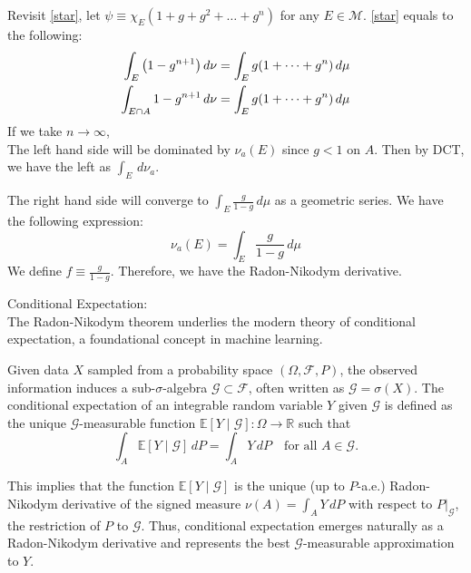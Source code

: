 \begin{prf}
Revisit \eqref{star}, let $\psi \equiv \chi_E(1+g+g^2+\dots + g^n)$ for any $E\in \mathcal M$. \eqref{star} equals to the following:  
\begin{align*}
	\int_E\qty(1-g^{n+1})\, d\nu &= \int_E g\qty(1+\dots + g^n)\, d\mu\\
	\int_{E\cap A} 1-g^{n+1}\, d\nu &= \int_E  g\qty(1+\dots + g^n)\, d\mu
\end{align*}
If we take $n\to \infty$, \\

The left hand side will be dominated by $\nu_a(E)$ since $g<1$ on $A$. Then by DCT, we have the left as $\int_E \, d\nu_a$. 

The right hand side will converge to $\int_E \frac{g}{1-g}\, d\mu$ as a geometric series. We have the following expression: 
$$\nu_a(E) = \int_E \frac{g}{1-g} \, d\mu$$
We define $f\equiv \frac{g}{1-g}$. Therefore, we have the Radon-Nikodym derivative. 

\end{prf}


\begin{rmk}{Conditional Expectation:}\\
The Radon-Nikodym theorem underlies the modern theory of conditional expectation, a foundational concept in machine learning. 

Given data \( X \) sampled from a probability space \( (\Omega, \mathcal{F}, P) \), the observed information induces a sub-\(\sigma\)-algebra \( \mathcal{G} \subset \mathcal{F} \), often written as \( \mathcal{G} = \sigma(X) \). The conditional expectation of an integrable random variable \( Y \) given \( \mathcal{G} \) is defined as the unique \( \mathcal{G} \)-measurable function \( \mathbb{E}[Y \mid \mathcal{G}] : \Omega \to \mathbb{R} \) such that
\[
\int_A \mathbb{E}[Y \mid \mathcal{G}] \, dP = \int_A Y \, dP \quad \text{for all } A \in \mathcal{G}.
\]

This implies that the function \( \mathbb{E}[Y \mid \mathcal{G}] \) is the unique (up to $P$-a.e.) Radon-Nikodym derivative of the signed measure \( \nu(A) = \int_A Y \, dP \) with respect to \( P|_{\mathcal{G}} \), the restriction of \( P \) to \( \mathcal{G} \). Thus, conditional expectation emerges naturally as a Radon-Nikodym derivative and represents the best \( \mathcal{G} \)-measurable approximation to \( Y \).
\end{rmk}
 
 


